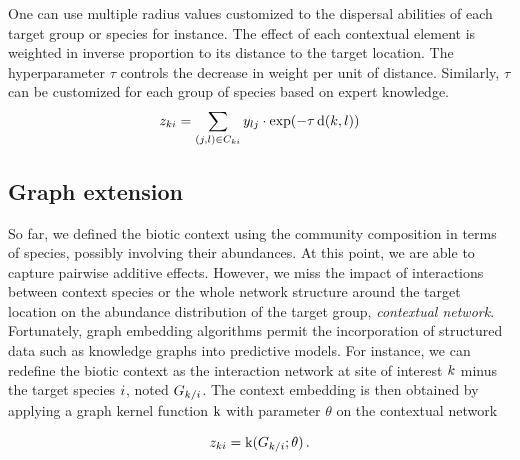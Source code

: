 \documentclass[10pt,a4paper]{article}
\begin{document}
One can use multiple radius values customized to the dispersal abilities of each target group or species for instance. The effect of each contextual element is weighted in inverse proportion to its distance to the target location. The hyperparameter $\tau$ controls the decrease in weight per unit of distance. Similarly, $\tau$ can be customized for each group of species based on expert knowledge.  
\begin{equation*}
  z_{ki} = \sum_{(j, l) \in C_{ki}} y_{lj} \cdot \exp(-\tau \operatorname{d}(k, l))
\end{equation*}

\subsection{Graph extension}
So far, we defined the biotic context using the community composition in terms of species, possibly involving their abundances. At this point, we are able to capture pairwise additive effects. However, we miss the impact of interactions between context species or the whole network structure around the target location on the abundance distribution of the target group, \emph{contextual network}.\\ 

Fortunately, graph embedding algorithms permit the incorporation of structured data such as knowledge graphs into predictive models. For instance, we can redefine the biotic context as the interaction network at site of interest $k$ minus the target species $i$, noted $G_{k/i}$. The context embedding is then obtained by applying a graph kernel function $\operatorname{k}$ with parameter $\theta$ on the contextual network

\begin{equation*}
  z_{ki} = \operatorname{k}(G_{k/i}; \theta)\,. 
\end{equation*}


	
\end{document}
